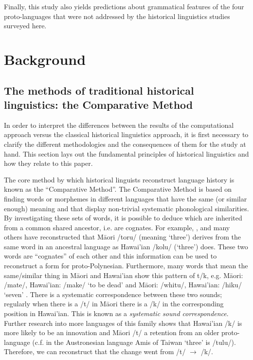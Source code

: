 \documentclass[a4paper,10pt]{article} %
\begin{document}
Finally, this study also yields predictions about grammatical features of the four proto-languages that were not addressed by the historical linguistics studies surveyed here.



\section{Background}
\label{recon_grammar}

\subsection{The methods of traditional historical linguistics: the Comparative Method}
\label{sec:ars:metod:hist}
In order to interpret the differences between the results of the computational approach versus the classical historical linguistics approach, it is first necessary to clarify the different methodologies and the consequences of them for the study at hand. This section lays out the fundamental principles of historical linguistics and how they relate to this paper.

The core method by which historical linguists reconstruct language history is known as the ``Comparative Method''. The Comparative Method is based on finding words or morphemes in different languages that have the same (or similar enough) meaning and that display non-trivial systematic phonological similarities. By investigating these sets of words, it is possible to deduce which are inherited from a common shared ancestor, i.e. are cognates. For example, \citet{blust2004}, \citet{greenhill2011pollex} and many others have reconstructed that M\={a}ori /toru/ (meaning `three') derives from the same word in an ancestral language as Hawai'ian /kolu/ (`three') does. These two words are ``cognates'' of each other and this information can be used to reconstruct a form for proto-Polynesian. Furthermore, many words that mean the same/similar thing in M\={a}ori and Hawai'ian show this pattern of t/k, e.g. M\={a}ori: /mate/, Hawai'ian: /make/ `to be dead'  and M\={a}ori: /whitu/, Hawai'ian: /hiku/ `seven' \citep{ABVD}. There is a systematic correspondence between these two sounds; regularly when there is a /t/ in M\={a}ori there is a /k/ in the corresponding position in Hawai'ian. This is known as a \emph{systematic sound correspondence}. Further research into more languages of this family shows that Hawai'ian /k/ is more likely to be an innovation and M\={a}ori /t/ a retention from an older proto-language (c.f. in the Austronesian language Amis of Taiwan `three' is /tulu/). Therefore, we can reconstruct that the change went from /t/ $\rightarrow$ /k/.
\end{document}
